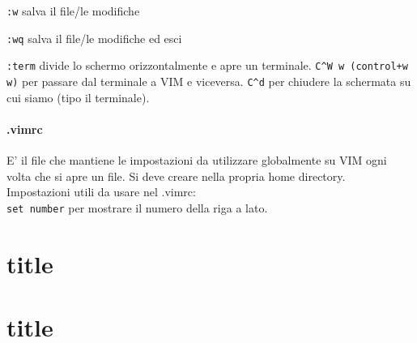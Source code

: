 \documentclass[]{report}
\begin{document}
\verb|:w| salva il file/le modifiche

\verb|:wq| salva il file/le modifiche ed esci

\verb|:term| divide lo schermo orizzontalmente e apre un terminale. \verb|C^W w (control+w w)| per passare dal terminale a VIM e viceversa. \verb|C^d| per chiudere la schermata su cui siamo (tipo il terminale).

\subsubsection{.vimrc}
E' il file che mantiene le impostazioni da utilizzare globalmente su VIM ogni volta che si apre un file. Si deve creare nella propria home directory.\\

Impostazioni utili da usare nel .vimrc:\\
\verb|set number| per  mostrare il numero della riga a lato.\\
\verb||


\chapter{title}
\chapter{title}
\end{document}
